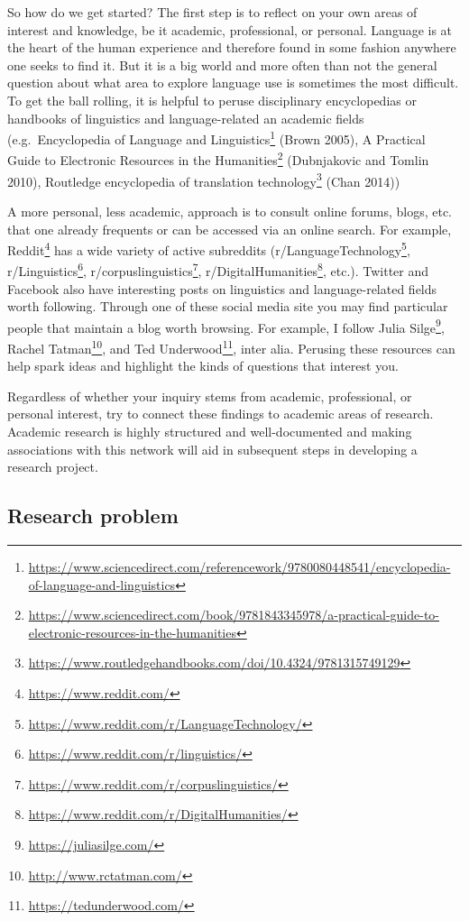 \documentclass[
  letterpaper,
]{latex/krantz}
\DeclareRobustCommand{\href}[2]{#2\footnote{\url{#1}}}
\begin{document}
So how do we get started? The first step is to reflect on your own areas
of interest and knowledge, be it academic, professional, or personal.
Language is at the heart of the human experience and therefore found in
some fashion anywhere one seeks to find it. But it is a big world and
more often than not the general question about what area to explore
language use is sometimes the most difficult. To get the ball rolling,
it is helpful to peruse disciplinary encyclopedias or handbooks of
linguistics and language-related an academic fields
(e.g.~\href{https://www.sciencedirect.com/referencework/9780080448541/encyclopedia-of-language-and-linguistics}{Encyclopedia
of Language and Linguistics} (Brown 2005),
\href{https://www.sciencedirect.com/book/9781843345978/a-practical-guide-to-electronic-resources-in-the-humanities}{A
Practical Guide to Electronic Resources in the Humanities} (Dubnjakovic
and Tomlin 2010),
\href{https://www.routledgehandbooks.com/doi/10.4324/9781315749129}{Routledge
encyclopedia of translation technology} (Chan 2014))

A more personal, less academic, approach is to consult online forums,
blogs, etc. that one already frequents or can be accessed via an online
search. For example, \href{https://www.reddit.com/}{Reddit} has a wide
variety of active subreddits
(\href{https://www.reddit.com/r/LanguageTechnology/}{r/LanguageTechnology},
\href{https://www.reddit.com/r/linguistics/}{r/Linguistics},
\href{https://www.reddit.com/r/corpuslinguistics/}{r/corpuslinguistics},
\href{https://www.reddit.com/r/DigitalHumanities/}{r/DigitalHumanities},
etc.). Twitter and Facebook also have interesting posts on linguistics
and language-related fields worth following. Through one of these social
media site you may find particular people that maintain a blog worth
browsing. For example, I follow \href{https://juliasilge.com/}{Julia
Silge}, \href{http://www.rctatman.com/}{Rachel Tatman}, and
\href{https://tedunderwood.com/}{Ted Underwood}, inter alia. Perusing
these resources can help spark ideas and highlight the kinds of
questions that interest you.

Regardless of whether your inquiry stems from academic, professional, or
personal interest, try to connect these findings to academic areas of
research. Academic research is highly structured and well-documented and
making associations with this network will aid in subsequent steps in
developing a research project.

\hypertarget{research-problem}{%
\subsection{Research problem}\label{research-problem}}
\end{document}

